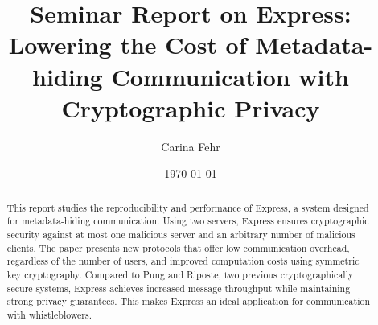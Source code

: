 \documentclass[a4paper]{article}
\author{Carina Fehr}
\title{Seminar Report on Express: Lowering the Cost of Metadata-hiding Communication with Cryptographic Privacy}
\date{\today}
\begin{document}
\maketitle

\begin{abstract}
This report studies the reproducibility and performance of Express, a system designed for metadata-hiding communication. Using two servers, Express ensures cryptographic security against at most one malicious server and an arbitrary number of malicious clients. The paper presents new protocols that offer low communication overhead, regardless of the number of users, and improved computation costs using symmetric key cryptography. Compared to Pung and Riposte, two previous cryptographically secure systems, Express achieves increased message throughput while maintaining strong privacy guarantees. This makes Express an ideal application for communication with whistleblowers.
\end{abstract}
\end{document}
